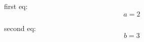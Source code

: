 \documentclass{article}
\begin{document}

first eq:
\[
  a = 2
\]

second eq:
\[b=3\]


\end{document}

